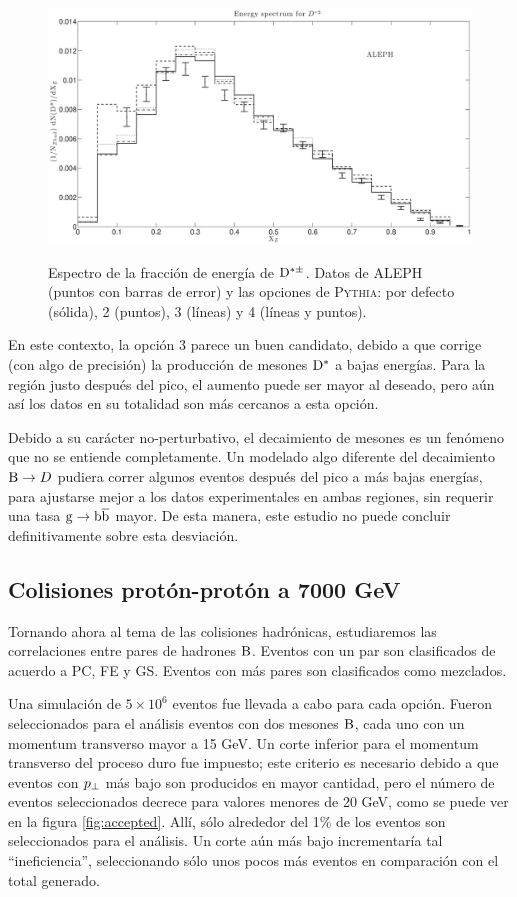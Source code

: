 \documentclass[a4paper,12pt]{article}
\begin{document}
\begin{figure}[!h]
\centering
\caption[Espectro de la fracción de energía de $\D^{*\pm}$. Simulación y datos comparados.]{Espectro de la fracción de energía de $\D^{*\pm}$. Datos de ALEPH (puntos con barras de error) y las opciones de \textsc{Pythia}: por defecto (sólida), 2 (puntos), 3 (líneas) y 4 (líneas y puntos).}
\includegraphics[width=15cm]{DStarOpThesis}
\label{fig:DStarOp}
\end{figure}

En este contexto, la opción 3 parece un buen candidato, debido a que corrige (con algo de precisión) la producción de mesones ${\mathrm D}^*$ a bajas energías. Para la región justo después del pico, el aumento puede ser mayor al deseado, pero aún así los datos en su totalidad son más cercanos a esta opción.

Debido a su carácter no-perturbativo, el decaimiento de mesones es un fenómeno que no se entiende completamente. Un modelado algo diferente del decaimiento ${\mathrm B}\to D$ pudiera correr algunos eventos después del pico a más bajas energías, para ajustarse mejor a los datos experimentales en ambas regiones, sin requerir una tasa ${\mathrm g}\to{\mathrm b}\overline{\mathrm b}$ mayor. De esta manera, este estudio no puede concluir definitivamente sobre esta desviación.

\subsection{Colisiones protón-protón a 7000 GeV}

Tornando ahora al tema de las colisiones hadrónicas, estudiaremos las correlaciones entre pares de hadrones ${\mathrm B}$. Eventos con un par son clasificados de acuerdo a PC, FE y GS. Eventos con más pares son clasificados como mezclados.

Una simulación de $5\times10^6$ eventos fue llevada a cabo para cada opción. Fueron seleccionados para el análisis eventos con dos mesones ${\mathrm B}$, cada uno con un momentum transverso mayor a 15 GeV. Un corte inferior para el momentum transverso del proceso duro fue impuesto; este criterio es necesario debido a que eventos con $p_{\perp}$ más bajo son producidos en mayor cantidad, pero el número de eventos seleccionados decrece para valores menores de 20 GeV, como se puede ver en la figura \ref{fig:accepted}. Allí, sólo alrededor del 1\% de los eventos son seleccionados para el análisis. Un corte aún más bajo incrementaría tal ``ineficiencia'', seleccionando sólo unos pocos más eventos en comparación con el total generado.
\end{document}
